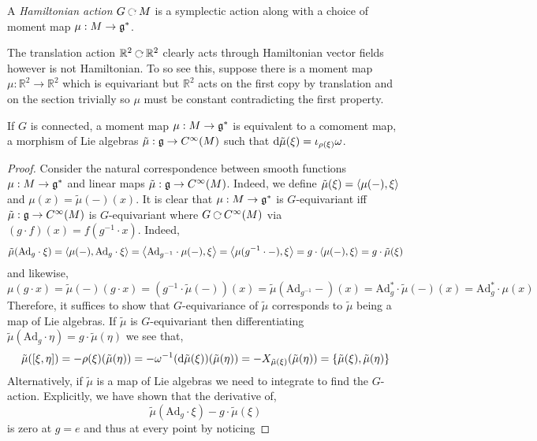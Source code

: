 \documentclass[12pt]{extarticle}
\newcommand{\R}{\mathbb{R}}
\newcommand{\Ad}{\mathrm{Ad}}
\begin{document}
\begin{defn}
A \textit{Hamiltonian action} $G \acts M$ is a symplectic action along with a choice of moment map $\mu : M \to \mathfrak{g}^*$.
\end{defn}

\begin{example}
The translation action $\R^2 \acts \R^2$ clearly acts through Hamiltonian vector fields however is not Hamiltonian. To so see this, suppose there is a moment map $\mu : \R^2 \to \R^2$ which is equivariant but $\R^2$ acts on the first copy by translation and on the section trivially so $\mu$ must be constant contradicting the first property. 
\end{example}

\begin{lemma}
If $G$ is connected, a moment map $\mu : M \to \mathfrak{g}^*$ is equivalent to a comoment map, a morphism of Lie algebras $\tilde{\mu} : \mathfrak{g} \to C^\infty(M)$ such that $\mathrm{d}{\tilde{\mu}(\xi)} = \iota_{\rho(\xi)} \omega$.
\end{lemma}

\begin{proof}
Consider the natural correspondence between smooth functions $\mu : M \to \mathfrak{g}^*$ and linear maps $\tilde{\mu} : \mathfrak{g} \to C^\infty(M)$. Indeed, we define $\tilde{\mu}(\xi) = \left< \mu(-) , \xi \right>$ and $\mu(x) = \tilde{\mu}(-)(x)$. It is clear that $\mu : M \to \mathfrak{g}^*$ is $G$-equivariant iff $\tilde{\mu} : \mathfrak{g} \to C^\infty(M)$ is $G$-equivariant where $G \acts C^\infty(M)$ via $(g \cdot f)(x) = f(g^{-1} \cdot x)$. Indeed,
\[ 
\tilde{\mu}(\Ad_g \cdot \xi) = \inner{\mu(-)}{\mathrm{Ad}_g \cdot \xi} = \inner{\Ad_{g^{-1}} \cdot \mu(-)}{\xi} = \inner{\mu(g^{-1} \cdot - )}{\xi} = g \cdot \inner{\mu(-)}{\xi} = g \cdot \tilde{\mu}(\xi) \]
and likewise,
\[ \mu(g \cdot x) = \tilde{\mu}(-)(g \cdot x) = (g^{-1} \cdot \tilde{\mu}(-))(x) = \tilde{\mu}(\mathrm{Ad}_{g^{-1}} -)(x) = \Ad_g^* \cdot \tilde{\mu}(-)(x) = \Ad_g^* \cdot \mu(x) \]
Therefore, it suffices to show that $G$-equivariance of $\tilde{\mu}$ corresponds to $\tilde{\mu}$ being a map of Lie algebras. If $\tilde{\mu}$ is $G$-equivariant then differentiating $\tilde{\mu}(\Ad_g \cdot \eta) = g \cdot \tilde{\mu}(\eta)$ we see that,
\[ \tilde{\mu}([\xi, \eta]) = -\rho(\xi) (\tilde{\mu}(\eta)) = -\omega^{-1}(\mathrm{d}{\tilde{\mu}(\xi)})(\tilde{\mu}(\eta)) = - X_{\tilde{\mu}(\xi)}(\tilde{\mu}(\eta)) = \{ \tilde{\mu}(\xi), \tilde{\mu}(\eta) \}  \]
Alternatively, if $\tilde{\mu}$ is a map of Lie algebras we need to integrate to find the $G$-action. Explicitly, we have shown that the derivative of,
\[ \tilde{\mu}(\Ad_g \cdot \xi) - g \cdot \tilde{\mu}(\xi) \]
is zero at $g = e$ and thus at every point by noticing                                          
\end{proof}
\end{document}
